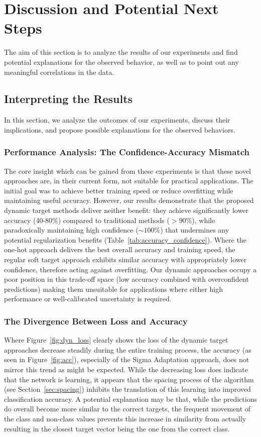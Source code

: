 \documentclass[12pt,fleqn,a4paper]{article}
\begin{document}
\section{Discussion and Potential Next Steps}\label{sec:disc}
The aim of this section is to analyze the results of our experiments and find potential explanations for the observed behavior, as well as to point out any meaningful correlations in the data.

\subsection{Interpreting the Results}
In this section, we analyze the outcomes of our experiments, discuss their implications, and propose possible explanations for the observed behaviors.


\subsubsection{Performance Analysis: The Confidence-Accuracy Mismatch}
The core insight which can be gained from these experiments is that these novel approaches are, in their current form, not suitable for practical applications. The initial goal was to achieve better training speed or reduce overfitting while maintaining useful accuracy. However, our results demonstrate that the proposed dynamic target methods deliver neither benefit: they achieve significantly lower accuracy (40-80\%) compared to traditional methods ($> 90\%$), while paradoxically maintaining high confidence ($\sim 100\%$) that undermines any potential regularization benefits (Table~\ref{tab:accuracy_confidence}).
Where the one-hot approach delivers the best overall accuracy and training speed, the regular soft target approach exhibits similar accuracy with appropriately lower confidence, therefore acting against overfitting. Our dynamic approaches occupy a poor position in this trade-off space (low accuracy combined with overconfident predictions) making them unsuitable for applications where either high performance or well-calibrated uncertainty is required.

\subsubsection{The Divergence Between Loss and Accuracy}
Where Figure~\ref{fig:dyn_loss} clearly shows the loss of the dynamic target approaches decrease steadily during the entire training process, the accuracy (as seen in Figure~\ref{fig:acc}), especially of the Sigma Adaptation approach, does not mirror this trend as might be expected. While the decreasing loss does indicate that the network is learning, it appears that the spacing process of the algorithm (see Section~\ref{sec:spacing}) inhibits the translation of this learning into improved classification accuracy. A potential explanation may be that, while the predictions do overall become more similar to the correct targets, the frequent movement of the class and non-class values prevents this increase in similarity from actually resulting in the closest target vector being the one from the correct class.
\end{document}
